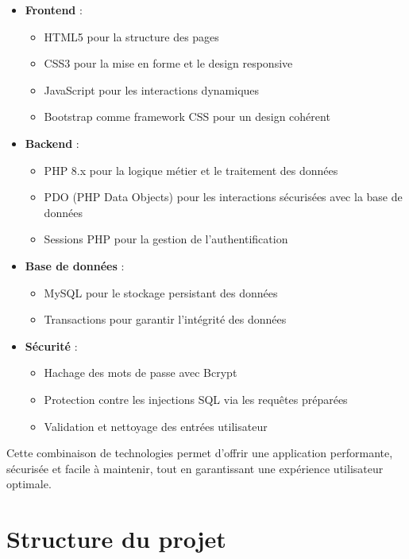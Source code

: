 \documentclass[12pt,a4paper]{report}
\begin{document}
\begin{itemize}
    \item \textbf{Frontend} :
    \begin{itemize}
        \item HTML5 pour la structure des pages
        \item CSS3 pour la mise en forme et le design responsive
        \item JavaScript pour les interactions dynamiques
        \item Bootstrap comme framework CSS pour un design cohérent
    \end{itemize}
    
    \item \textbf{Backend} :
    \begin{itemize}
        \item PHP 8.x pour la logique métier et le traitement des données
        \item PDO (PHP Data Objects) pour les interactions sécurisées avec la base de données
        \item Sessions PHP pour la gestion de l'authentification
    \end{itemize}
    
    \item \textbf{Base de données} :
    \begin{itemize}
        \item MySQL pour le stockage persistant des données
        \item Transactions pour garantir l'intégrité des données
    \end{itemize}
    
    \item \textbf{Sécurité} :
    \begin{itemize}
        \item Hachage des mots de passe avec Bcrypt
        \item Protection contre les injections SQL via les requêtes préparées
        \item Validation et nettoyage des entrées utilisateur
    \end{itemize}
\end{itemize}

Cette combinaison de technologies permet d'offrir une application performante, sécurisée et facile à maintenir, tout en garantissant une expérience utilisateur optimale.

\chapter{Structure du projet}
\end{document}
